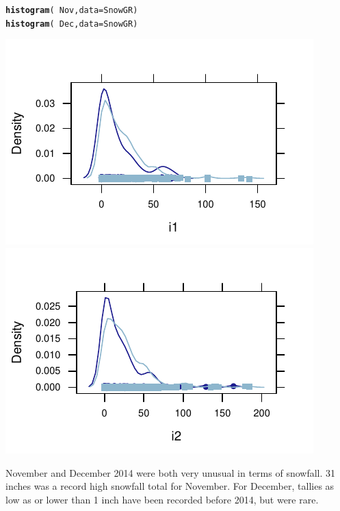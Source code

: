 \documentclass[twoside]{book}\usepackage[]{graphicx}\usepackage[]{xcolor}
\makeatletter
\def\maxwidth{ %
  \ifdim\Gin@nat@width>\linewidth
    \linewidth
  \else
    \Gin@nat@width
  \fi
}
\newcommand{\hlopt}[1]{\textcolor[rgb]{0,0,0}{#1}}%
\newcommand{\hlstd}[1]{\textcolor[rgb]{0.345,0.345,0.345}{#1}}%
\newcommand{\hlkwc}[1]{\textcolor[rgb]{0.333,0.667,0.333}{#1}}%
\newcommand{\hlkwd}[1]{\textcolor[rgb]{0.737,0.353,0.396}{\textbf{#1}}}%
\newenvironment{kframe}{%
 \def\at@end@of@kframe{}%
 \ifinner\ifhmode%
  \def\at@end@of@kframe{\end{minipage}}%
  \begin{minipage}{\columnwidth}%
 \fi\fi%
 \def\FrameCommand##1{\hskip\@totalleftmargin \hskip-\fboxsep
 \colorbox{shadecolor}{##1}\hskip-\fboxsep
     \hskip-\linewidth \hskip-\@totalleftmargin \hskip\columnwidth}%
 \MakeFramed {\advance\hsize-\width
   \@totalleftmargin\z@ \linewidth\hsize
   \@setminipage}}%
 {\par\unskip\endMakeFramed%
 \at@end@of@kframe}
\newenvironment{knitrout}{}{} %
\makeatother
\begin{document}
\begin{solution}
\begin{knitrout}
\color{fgcolor}\begin{kframe}
\begin{alltt}
\hlkwd{histogram}\hlstd{(}\hlopt{~}\hlstd{Nov,} \hlkwc{data} \hlstd{= SnowGR)}
\hlkwd{histogram}\hlstd{(}\hlopt{~}\hlstd{Dec,} \hlkwc{data} \hlstd{= SnowGR)}
\end{alltt}
\end{kframe}

{\centering \includegraphics[width=\maxwidth]{figures/fig-unnamed-chunk-35-1} 
\includegraphics[width=\maxwidth]{figures/fig-unnamed-chunk-35-2} 

}



\end{knitrout}
November and December 2014 were both very unusual in terms of snowfall. 31 inches was a record high snowfall
total for November.  For December, tallies as low as or lower than 1 inch have been recorded before 2014, 
but were rare.


\end{solution}
\end{document}
